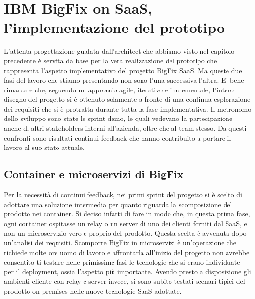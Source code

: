 \chapter{IBM BigFix on SaaS, l'implementazione del prototipo}
L'attenta progettazione guidata dall'architect che abbiamo visto nel capitolo precedente è servita da base per la vera realizzazione del prototipo che rappresenta l'aspetto implementativo del progetto BigFix SaaS. Ma queste due fasi del lavoro che stiamo presentando non sono l'una successiva l'altra. E' bene rimarcare che, seguendo un approccio agile, iterativo e incrementale, l'intero disegno del progetto si è ottenuto solamente a fronte di una continua esplorazione dei requisiti che si è protratta durante tutta la fase implementativa. Il metronomo dello sviluppo sono state le sprint demo, le quali vedevano la partecipazione anche di altri stakeholders interni all'azienda, oltre che al team stesso. Da questi confronti sono risultati continui feedback che hanno contribuito a portare il lavoro al suo stato attuale.

\section{Container e microservizi di BigFix}
Per la necessità di continui feedback, nei primi sprint del progetto si è scelto di adottare una soluzione intermedia per quanto riguarda la scomposizione del prodotto nei container. Si deciso infatti di fare in modo che, in questa prima fase, ogni container ospitasse un relay o un server di uno dei clienti forniti dal SaaS, e non un microservizio vero e proprio del prodotto. Questa scelta è avvenuta dopo un'analisi dei requisiti. Scomporre BigFix in microservizi è un'operazione che richiede molte ore uomo di lavoro e affrontarla all'inizio del progetto non avrebbe consentito ti testare nelle primissime fasi le tecnologie che si erano individuate per il deployment, ossia l'aspetto più importante. Avendo presto a disposizione gli ambienti cliente con relay e server invece, si sono subito testati scenari tipici del prodotto on premises nelle nuove tecnologie SaaS adottate.

